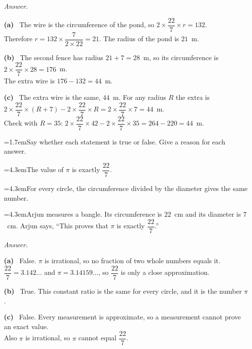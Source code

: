 \documentclass[11pt,a4paper]{article}
\newcommand{\nl}{\\[3pt]}
\newcounter{qn}
\newcommand{\ques}{\par\medskip\refstepcounter{qn}\noindent\hangindent=1.7em\hangafter=1\makebox[1.7em][l]{\textbf{\arabic{qn}.}}\ignorespaces}
\newcommand{\pc}[2]{\par\smallskip\noindent\hspace*{2em}\hangindent=4.3em\hangafter=1\makebox[2em][l]{(#1)}\hspace{0.3em}#2\par}
\newenvironment{answerblock}
  {\par\needspace{6\baselineskip}\smallskip\begingroup\small\linespread{1.2}\selectfont\color{muted}\noindent\textit{Answer.}\par}
  {\par\endgroup\medskip}
\newcommand{\ap}[1]{\par\smallskip\noindent\textbf{(#1)}\ }
\begin{document}
\begin{answerblock}
\ap{a} The wire is the circumference of the pond, so $2\times\dfrac{22}{7}\times r=132$.\nl
Therefore $r=132\times\dfrac{7}{2\times22}=21$. The radius of the pond is $21$~m.\nl
\ap{b} The second fence has radius $21+7=28$~m, so its circumference is $2\times\dfrac{22}{7}\times28=176$~m.\nl
The extra wire is $176-132=44$~m.\nl
\ap{c} The extra wire is the same, $44$~m. For any radius $R$ the extra is $2\times\dfrac{22}{7}\times(R+7)-2\times\dfrac{22}{7}\times R=2\times\dfrac{22}{7}\times7=44$~m.\nl
Check with $R=35$: $2\times\dfrac{22}{7}\times42-2\times\dfrac{22}{7}\times35=264-220=44$~m.
\begin{center}
\end{center}
\end{answerblock}

\ques Say whether each statement is true or false. Give a reason for each answer.\par
\pc{a}{The value of $\pi$ is exactly $\dfrac{22}{7}$.}
\pc{b}{For every circle, the circumference divided by the diameter gives the same number.}
\pc{c}{Arjun measures a bangle. Its circumference is $22$~cm and its diameter is $7$~cm. Arjun says, ``This proves that $\pi$ is exactly $\dfrac{22}{7}$.''}
\begin{answerblock}
\ap{a} False. $\pi$ is irrational, so no fraction of two whole numbers equals it.\nl
$\dfrac{22}{7}=3.142\ldots$ and $\pi=3.14159\ldots$, so $\dfrac{22}{7}$ is only a close approximation.\nl
\ap{b} True. This constant ratio is the same for every circle, and it is the number $\pi$.\nl
\ap{c} False. Every measurement is approximate, so a measurement cannot prove an exact value.\nl
Also $\pi$ is irrational, so $\pi$ cannot equal $\dfrac{22}{7}$.
\begin{center}
\end{center}
\end{answerblock}
\end{document}
